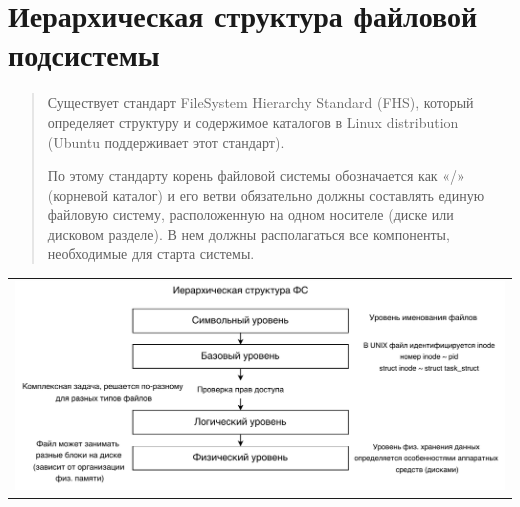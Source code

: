 \section{Иерархическая структура файловой подсистемы}

\begin{quote}
Существует стандарт FileSystem Hierarchy Standard (FHS), который определяет структуру и содержимое каталогов в Linux distribution (Ubuntu поддерживает этот стандарт).

По этому стандарту корень файловой системы обозначается как «/» (корневой каталог) и его ветви обязательно должны составлять единую файловую систему, расположенную на одном носителе (диске или дисковом разделе). В нем должны располагаться все компоненты, необходимые для старта системы.
\end{quote}

\begin{table}[h!]
  \centering
  \begin{tabular}{p{1\linewidth}}
    \centering
    \includegraphics[width=0.8\linewidth]{./images/ierarh_fs.pdf}
  \end{tabular}
\end{table}

